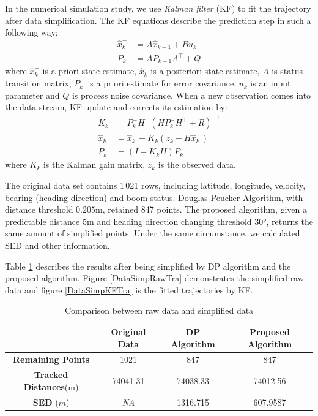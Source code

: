 In the numerical simulation study, we use \textit{Kalman filter} (KF) to fit the trajectory after data simplification. The KF equations describe the prediction step in such a following way: 
\begin{align*}
\hat{x}_k^-&=A\hat{x}_{k-1}+Bu_k \\
P_k^-&=AP_{k-1}A^\top+Q
\end{align*}
where $\hat{x}_k^-$ is a priori state estimate, $\hat{x}_k$ is a posteriori state estimate, $A$ is status transition matrix, $P_k^-$ is a priori estimate for error covariance, $u_k$ is an input parameter and $Q$ is process noise covariance. When a new observation comes into the data stream, KF update and corrects its estimation by: 
\begin{align*}
K_k&=P_k^-H^\top \left(HP_k^-H^\top+R\right)^{-1} \\
\hat{x}_k&=\hat{x}_k^-+K_k\left(z_k-H\hat{x}_k^-\right) \\
P_k&=(I-K_kH)P_k^-
\end{align*}
where $K_k$ is the Kalman gain matrix, $z_k$ is the observed data.


The original data set contains 1\,021 rows, including latitude, longitude, velocity, bearing (heading direction) and boom status. Douglas-Peucker Algorithm, with distance threshold $0.205$m, retained 847 points. The proposed algorithm, given a predictable distance $5$m and heading direction changing threshold $\ang{30}$, returns the same amount of simplified points. Under the same circumstance, we calculated SED and other information. 

Table \ref{DataSimpCompTable} describes the results after being simplified by DP algorithm and the proposed algorithm. Figure \ref{DataSimpRawTra} demonstrates the simplified raw data and figure \ref{DataSimpKFTra} is the fitted trajectories by KF. 

\begin{table}
\centering
\caption{Comparison between raw data and simplified data}
\label{DataSimpCompTable}\footnotesize
\begin{tabular}{|c|c|c|c|}
\hline 
  & \textbf{Original Data} & \textbf{DP Algorithm} & \textbf{Proposed Algorithm}  \\
\hline 
\textbf{Remaining Points} & 1021   & 847   & 847 \\
\hline 
\textbf{Tracked Distances}(m)  & 74041.31     & 74038.33    & 74012.56     \\
\hline 
\textbf{SED} ($m$)    & \textit{NA}    & 1316.715    & 607.9587   \\
\hline 
\end{tabular}
\end{table}
\normalsize

